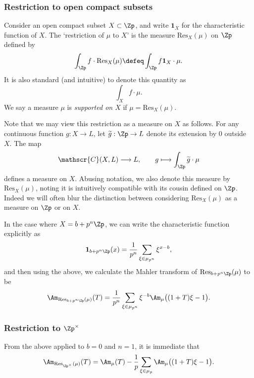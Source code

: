 \documentclass[a4paper,10pt, english, reqno]{smfart}
\newcommand{\sC}{\mathscr{C}}
\numberwithin{equation}{section}
\begin{document}
\subsubsection{Restriction to open compact subsets}

Consider an open compact subset $X \subset \Zp$, and write $\mathbf{1}_{X}$ for the characteristic function of $X$. The `restriction of $\mu$ to $X$' is the measure $\mathrm{Res}_{X}(\mu)$ on $\Zp$ defined by
\[
\int_{\Zp} f \cdot\mathrm{Res}_{X}(\mu) \defeq \int_{\Zp}f\mathbf{1}_{X} \cdot\mu.
\]
It is also standard (and intuitive) to denote this quantity as
\[
\int_X f\cdot \mu.
\]
We say a measure $\mu$ is \emph{supported on $X$} if $\mu = \mathrm{Res}_X(\mu)$.

\begin{remark}
Note that we may view this restriction as a measure on $X$ as follows. For any continuous function $g : X \to L$, let $\widetilde{g} : \Zp \to L$ denote its extension by 0 outside $X$. The map 
\[
\sC(X,L) \longrightarrow L, \qquad g \longmapsto \int_{\Zp}\widetilde{g} \cdot\mu
\]
defines a measure on $X$. Abusing notation, we also denote this measure by $\mathrm{Res}_X(\mu)$, noting it is intuitively compatible with its cousin defined on $\Zp$. Indeed we will often blur the distinction between considering $\mathrm{Res}_{X}(\mu)$ as a measure on $\Zp$ or on $X$.
\end{remark}

In the case where $X = b +p^n\Zp$, we can write the characteristic function explicitly as
\[\mathbf{1}_{b+p^n\Zp}(x) = \frac{1}{p^n}\sum_{\xi \in \mu_{p^n}}\xi^{x-b},\]
and then using the above, we calculate the Mahler transform of $\mathrm{Res}_{b+p^n\Zp}(\mu)$ to be
\begin{equation} \label{EqRestrictionFormula}
\Am_{\mathrm{Res}_{b + p^n\Zp}(\mu)}(T) = \frac{1}{p^n}\sum_{\xi \in \mu_{p^n}}\xi^{-b}\Am_{\mu}\big((1+T)\xi - 1\big).
\end{equation}

\subsubsection{Restriction to $\Zp^\times$}\label{sec:res to zpe}
From the above applied to $b=0$ and $n=1$, it is immediate that 
\begin{equation}\label{mahler transform restriction}\Am_{\mathrm{Res}_{\Zp^\times}(\mu)}(T) = \Am_\mu(T) - \frac{1}{p}\sum_{\xi \in \mu_{p}}\Am_{\mu}\big((1+T)\xi - 1\big).\end{equation}
\end{document}

